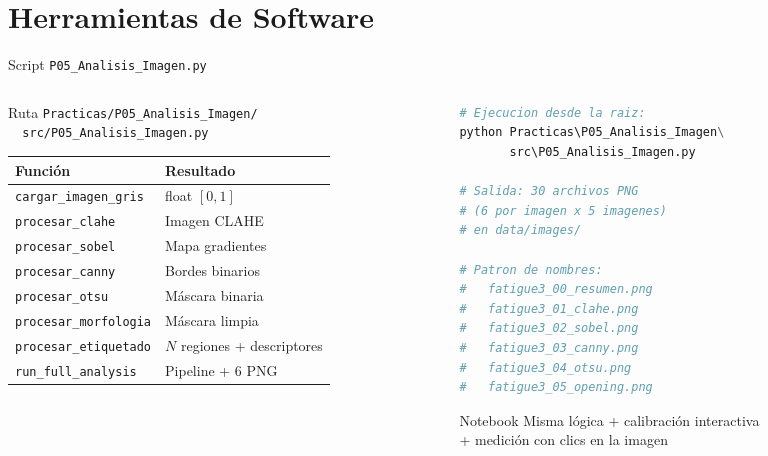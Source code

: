 \documentclass[aspectratio=169,12pt]{beamer}
\begin{document}
\section{Herramientas de Software}

\begin{frame}[fragile]{Script \texttt{P05\_Analisis\_Imagen.py}}
	\begin{columns}
		\begin{column}{0.5\textwidth}
			\begin{block}{Ruta}
				\scriptsize
				\texttt{Practicas/P05\_Analisis\_Imagen/}\\
				\texttt{\ \ src/P05\_Analisis\_Imagen.py}
			\end{block}
			\vspace{0.2em}
			\scriptsize
			\begin{tabular}{ll}
				\toprule
				\textbf{Función}
				 & \textbf{Resultado}          \\
				\midrule
				\texttt{cargar\_imagen\_gris}
				 & float $[0,1]$               \\
				\texttt{procesar\_clahe}
				 & Imagen CLAHE                \\
				\texttt{procesar\_sobel}
				 & Mapa gradientes             \\
				\texttt{procesar\_canny}
				 & Bordes binarios             \\
				\texttt{procesar\_otsu}
				 & Máscara binaria             \\
				\texttt{procesar\_morfologia}
				 & Máscara limpia              \\
				\texttt{procesar\_etiquetado}
				 & $N$ regiones + descriptores \\
				\texttt{run\_full\_analysis}
				 & Pipeline + 6 PNG            \\
				\bottomrule
			\end{tabular}
		\end{column}
		\begin{column}{0.47\textwidth}
			\begin{lstlisting}[language=Python]
# Ejecucion desde la raiz:
python Practicas\P05_Analisis_Imagen\
       src\P05_Analisis_Imagen.py

# Salida: 30 archivos PNG
# (6 por imagen x 5 imagenes)
# en data/images/

# Patron de nombres:
#   fatigue3_00_resumen.png
#   fatigue3_01_clahe.png
#   fatigue3_02_sobel.png
#   fatigue3_03_canny.png
#   fatigue3_04_otsu.png
#   fatigue3_05_opening.png
			\end{lstlisting}

			\vspace{0.2em}
			\begin{exampleblock}{Notebook}
				\scriptsize
				Misma lógica + calibración interactiva\\
				+ medición con clics en la imagen
			\end{exampleblock}
		\end{column}
	\end{columns}
\end{frame}
\end{document}

